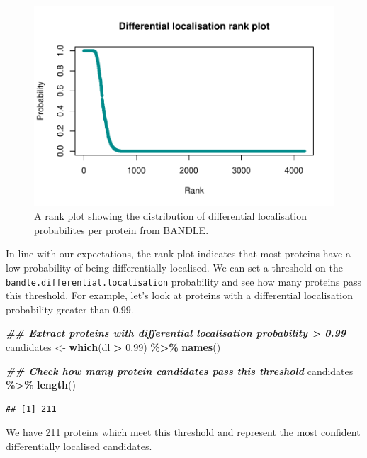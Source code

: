 \documentclass[9pt,a4paper,]{extarticle}
\newenvironment{Shaded}{\begin{snugshade}}{\end{snugshade}}
\newcommand{\DocumentationTok}[1]{\textcolor[rgb]{0.56,0.35,0.01}{\textbf{\textit{#1}}}}
\newcommand{\FloatTok}[1]{\textcolor[rgb]{0.00,0.00,0.81}{#1}}
\newcommand{\FunctionTok}[1]{\textcolor[rgb]{0.13,0.29,0.53}{\textbf{#1}}}
\newcommand{\NormalTok}[1]{#1}
\newcommand{\OtherTok}[1]{\textcolor[rgb]{0.56,0.35,0.01}{#1}}
\newcommand{\SpecialCharTok}[1]{\textcolor[rgb]{0.81,0.36,0.00}{\textbf{#1}}}
\begin{document}
\begin{figure}[H]

{\centering \includegraphics[width=0.8\linewidth,]{figs/bandle_dl_prob_rank} 

}

\caption{A rank plot showing the distribution of differential localisation probabilites per protein from BANDLE.}\label{fig:diff-loc-rank}
\end{figure}

In-line with our expectations, the rank plot indicates that most proteins have a
low probability of being differentially localised. We can set a threshold on the
\texttt{bandle.differential.localisation} probability and see how many proteins pass
this threshold. For example, let's look at proteins with a differential localisation
probability greater than 0.99.

\begin{Shaded}
\begin{Highlighting}[]
\DocumentationTok{\#\# Extract proteins with differential localisation probability \textgreater{} 0.99}
\NormalTok{candidates }\OtherTok{\textless{}{-}} \FunctionTok{which}\NormalTok{(dl }\SpecialCharTok{\textgreater{}} \FloatTok{0.99}\NormalTok{) }\SpecialCharTok{\%\textgreater{}\%} 
  \FunctionTok{names}\NormalTok{()}

\DocumentationTok{\#\# Check how many protein candidates pass this threshold}
\NormalTok{candidates }\SpecialCharTok{\%\textgreater{}\%} 
  \FunctionTok{length}\NormalTok{()}
\end{Highlighting}
\end{Shaded}

\begin{verbatim}
## [1] 211
\end{verbatim}

We have 211 proteins which meet this
threshold and represent the most confident differentially localised candidates.
\end{document}
